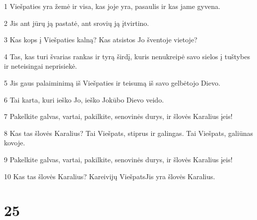 \par 1 Viešpaties yra žemė ir visa, kas joje yra, pasaulis ir kas jame gyvena. 
\par 2 Jis ant jūrų ją pastatė, ant srovių ją įtvirtino. 
\par 3 Kas kops į Viešpaties kalną? Kas atsistos Jo šventoje vietoje? 
\par 4 Tas, kas turi švarias rankas ir tyrą širdį, kuris nenukreipė savo sielos į tuštybes ir neteisingai neprisiekė. 
\par 5 Jis gaus palaiminimą iš Viešpaties ir teisumą iš savo gelbėtojo Dievo. 
\par 6 Tai karta, kuri ieško Jo, ieško Jokūbo Dievo veido. 
\par 7 Pakelkite galvas, vartai, pakilkite, senovinės durys, ir šlovės Karalius įeis! 
\par 8 Kas tas šlovės Karalius? Tai Viešpats, stiprus ir galingas. Tai Viešpats, galiūnas kovoje. 
\par 9 Pakelkite galvas, vartai, pakilkite, senovinės durys, ir šlovės Karalius įeis! 
\par 10 Kas tas šlovės Karalius? Kareivijų Viešpats­Jis yra šlovės Karalius.



\chapter{25}


